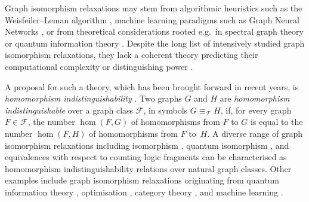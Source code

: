 \documentclass[11pt]{scrartcl}
\theoremstyle{definition}
\theoremstyle{plain}
\theoremstyle{remark}
\begin{document}
	Graph isomorphism relaxations may stem from algorithmic heuristics such as the Weisfeiler--Leman algorithm \cite{kiefer_weisfeiler-leman_2020},
	machine learning paradigms such as Graph Neural Networks \cite{grohe_logic_2021,xu_how_2019,morris_weisfeiler_2019}, or from
	theoretical considerations rooted e.g.\ in spectral graph theory or quantum information theory \cite{atserias_quantum_2019}.
	Despite the long list of intensively studied graph isomorphism relaxations,
	they lack a coherent theory predicting their computational complexity or distinguishing power \cite{grohe_thoughts_2025}.

	A proposal for such a theory, which has been brought forward in recent years, is 
	\emph{homomorphism indistinguishability} \cite{seppelt_homomorphism_2024}.
	Two graphs $G$ and $H$ are \emph{homomorphism indistinguishable} over a graph class $\mathcal{F}$,
	in symbols $G \equiv_{\mathcal{F}} H$,
	if, for every graph $F \in \mathcal{F}$, the number $\hom(F, G)$ of homomorphisms 
	from $F$ to $G$ is equal to the number $\hom(F, H)$ of homomorphisms from $F$ to~$H$.
	A diverse range of graph isomorphism relaxations including isomorphism \cite{lovasz_operations_1967}, 
	quantum isomorphism \cite{mancinska_quantum_2020},
	and
	equivalences with respect to counting logic fragments \cite{dvorak_recognizing_2010,dell_lovasz_2018,schindling_homomorphism_2025,montacute_pebble-relation_2024,dawar_lovasz-type_2021,adler_going_2026}
	can be characterised as homomorphism indistinguishability relations over natural graph classes.
	Other examples include graph isomorphism relaxations originating from quantum information theory \cite{mancinska_quantum_2020,seppelt_quantum_2025}, optimisation \cite{kar_npa_2026,roberson_lasserre_2024}, category theory \cite{dawar_lovasz-type_2021,abramsky_discrete_2022}, and machine learning \cite{zhang_beyond_2024,gai_homomorphism_2025}.
\end{document}
